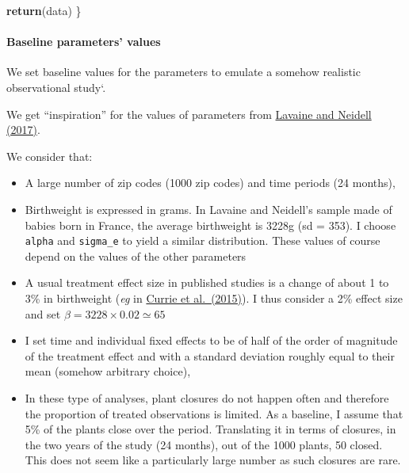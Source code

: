 \documentclass[
]{article}
\newenvironment{Shaded}{\begin{snugshade}}{\end{snugshade}}
\newcommand{\FunctionTok}[1]{\textcolor[rgb]{0.13,0.29,0.53}{\textbf{#1}}}
\newcommand{\NormalTok}[1]{#1}
\providecommand{\tightlist}{%
  \setlength{\itemsep}{0pt}\setlength{\parskip}{0pt}}
\begin{document}
\begin{Shaded}
\begin{Highlighting}[]
  \FunctionTok{return}\NormalTok{(data)}
\NormalTok{\}}
\end{Highlighting}
\end{Shaded}

\hypertarget{baseline-parameters-values}{%
\paragraph{Baseline parameters'
values}\label{baseline-parameters-values}}

We set baseline values for the parameters to emulate a somehow realistic
observational study`.

We get ``inspiration'' for the values of parameters from
\href{https://www.journals.uchicago.edu/doi/full/10.1086/691554}{Lavaine
and Neidell (2017)}.

We consider that:

\begin{itemize}
\tightlist
\item
  A large number of zip codes (1000 zip codes) and time periods (24
  months),
\item
  Birthweight is expressed in grams. In Lavaine and Neidell's sample
  made of babies born in France, the average birthweight is 3228g (sd =
  353). I choose \texttt{alpha} and \texttt{sigma\_e} to yield a similar
  distribution. These values of course depend on the values of the other
  parameters
\item
  A usual treatment effect size in published studies is a change of
  about 1 to 3\% in birthweight (\emph{eg} in
  \href{https://www.aeaweb.org/articles?id=10.1257/aer.20121656}{Currie
  et al.~(2015)}). I thus consider a 2\% effect size and set
  \(\beta = 3228 \times 0.02 \simeq 65\)
\item
  I set time and individual fixed effects to be of half of the order of
  magnitude of the treatment effect and with a standard deviation
  roughly equal to their mean (somehow arbitrary choice),
\item
  In these type of analyses, plant closures do not happen often and
  therefore the proportion of treated observations is limited. As a
  baseline, I assume that 5\% of the plants close over the period.
  Translating it in terms of closures, in the two years of the study (24
  months), out of the 1000 plants, 50 closed. This does not seem like a
  particularly large number as such closures are rare.
\end{itemize}
\end{document}
